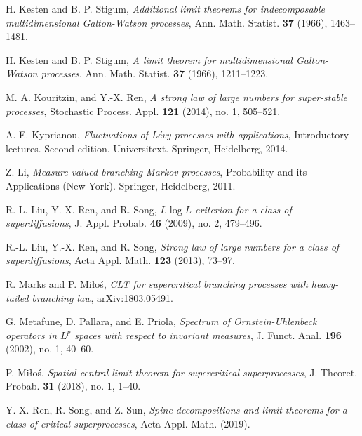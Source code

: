\documentclass[12pt,a4paper]{amsart}
\theoremstyle{plain}
\theoremstyle{definition}
\numberwithin{equation}{section}
\begin{document}
\begin{thebibliography}{10}
  H. Kesten and B. P. Stigum, 
  \emph{Additional limit theorems for indecomposable multidimensional {G}alton-{W}atson processes},
  Ann. Math. Statist. \textbf{37} (1966), 1463--1481.

  H. Kesten and B. P. Stigum, 
  \emph{A limit theorem for multidimensional {G}alton-{W}atson processes}, 
  Ann. Math. Statist. \textbf{37} (1966), 1211--1223.

  M. A. Kouritzin, and Y.-X. Ren,  
  \emph{A strong law of large numbers for super-stable processes},  
  Stochastic Process. Appl. \textbf{121} (2014), no. 1, 505--521.

  A. E. Kyprianou, 
  \emph{Fluctuations of {L}\'{e}vy processes with applications},
  Introductory lectures. Second edition. Universitext. Springer, Heidelberg, 2014.

  Z. Li, 
  \emph{Measure-valued branching {M}arkov processes}, 
  Probability and its Applications (New York). Springer, Heidelberg, 2011.

  R.-L. Liu, Y.-X. Ren, and R. Song, 
  \emph{{$L\log L$} criterion for a class of superdiffusions}, 
  J. Appl. Probab. \textbf{46} (2009), no. 2, 479--496.

  R.-L. Liu, Y.-X. Ren, and R. Song, 
  \emph{Strong law of large numbers for a class of superdiffusions}, 
  Acta Appl. Math. \textbf{123} (2013), 73--97.

  R. Marks and P. Mi{\l}o{\'s}, 
  \emph{C{LT} for supercritical branching processes with heavy-tailed branching law}, 
  arXiv:1803.05491.

  G. Metafune, D. Pallara, and E. Priola, 
  \emph{Spectrum of {O}rnstein-{U}hlenbeck operators in {$L^p$} spaces with respect to invariant  measures}, 
  J. Funct. Anal. \textbf{196} (2002), no. 1, 40--60.

  P. Mi{\l}o{\'s},
  \emph{Spatial central limit theorem for supercritical superprocesses},
  J. Theoret. Probab. \textbf{31} (2018), no. 1, 1--40.

  Y.-X. Ren, R. Song, and Z. Sun, 
  \emph{Spine decompositions and limit theorems for a class of critical superprocesses},
  Acta Appl. Math. (2019).


\end{thebibliography}
\end{document}
